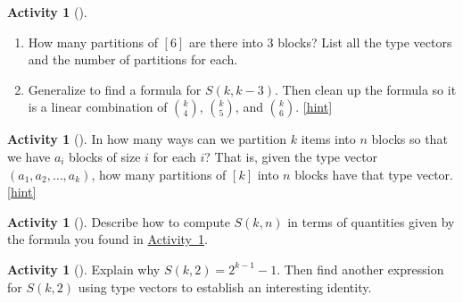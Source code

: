 \documentclass[10pt,]{book}
\theoremstyle{plain}
\theoremstyle{definition}
\theoremstyle{definition}
\theoremstyle{definition}
\newtheorem{activity}[project]{Activity}
\numberwithin{equation}{chapter}
\begin{document}
\begin{activity}[]\label{activity-268}
\leavevmode%
\begin{enumerate}[font=\bfseries,label=(\alph*),ref=\alph*]
\item\label{task-259} \hypertarget{p-1410}{}%
How many partitions of \([6]\) are there into 3 blocks?  List all the type vectors and the number of partitions for each.%
\item\label{task-260} \hypertarget{p-1411}{}%
Generalize to find a formula for \(S(k,k-3)\).  Then clean up the formula so it is a linear combination of \(\binom{k}{4}\), \(\binom{k}{5}\), and \(\binom{k}{6}\).%
\hfill{\tiny\hyperlink{a-275.b}{[hint]}\hypertarget{q-275.b}{}}\end{enumerate}
\end{activity}
\begin{activity}[]\label{partitionsgivenpartsize}
\hypertarget{p-1413}{}%
In how many ways can we partition \(k\) items into \(n\) blocks so that we have \(a_i\) blocks of size \(i\) for each \(i\)? That is, given the type vector \((a_1, a_2, \ldots, a_k)\), how many partitions of \([k]\) into \(n\) blocks have that type vector.%
\hfill{\tiny\hyperlink{a-276}{[hint]}\hypertarget{q-276}{}}\end{activity}
\begin{activity}[]\label{activity-270}
\hypertarget{p-1416}{}%
Describe how to compute \(S(k,n)\) in terms of quantities given by the formula you found in \hyperref[partitionsgivenpartsize]{Activity~\ref{partitionsgivenpartsize}}.%
\end{activity}
\begin{activity}[]\label{activity-271}
\hypertarget{p-1418}{}%
Explain why \(S(k, 2) = 2^{k-1} - 1\).  Then find another expression for \(S(k,2)\) using type vectors to establish an interesting identity.%
\end{activity}
\typeout{************************************************}
\typeout{************************************************}
\end{document}
